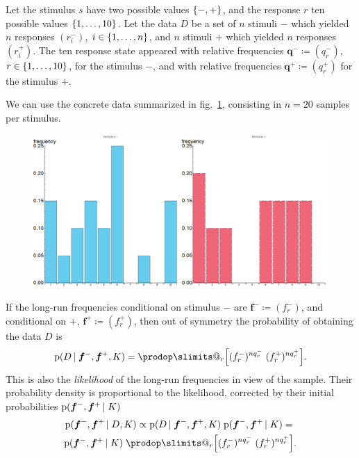 \documentclass[\ifafour a4paper,12pt,\else a5paper,10pt,\fi%
onecolumn,oneside,article,%
british%
]{memoir}
\makeatletter
\theoremstyle{remark}
\theoremstyle{innote}
\def\prod{\DOTSI\prodop\slimits@}
\newcommand*{\defd}{\coloneqq}
\DeclarePairedDelimiter\set{\{}{\}}
\newcommand*{\pf}{\mathrm{p}}%
\renewcommand*{\|}{\nonscript\,\vert\nonscript\;\mathopen{}}
\newcommand*{\fig}{fig.}%
\newcommand*{\ym}{\mathord{-}}
\newcommand*{\yp}{\mathord{+}}
\newcommand*{\yrm}{r^{-}}
\newcommand*{\yrp}{r^{+}}
\newcommand*{\yfm}{f^{-}}
\newcommand*{\yfp}{f^{+}}
\newcommand*{\yfvm}{\bm{f}^{-}}
\newcommand*{\yfvp}{\bm{f}^{+}}
\newcommand*{\yqm}{q^{-}}
\newcommand*{\yqp}{q^{+}}
\newcommand*{\yqvm}{\bm{q}^{-}}
\newcommand*{\yqvp}{\bm{q}^{+}}
\newcommand*{\yI}{K}
\makeatother
\begin{document}
Let the stimulus $s$ have two possible values $\set{\ym,\yp}$, and the
response $r$ ten possible values $\set{1,\dotsc, 10}$. Let the data $D$ be
a set of $n$ stimuli $\ym$ which yielded $n$ responses $(\yrm_i)$,
$i \in \set{1,\dotsc, n}$, and $n$ stimuli $\yp$ which yielded $n$
responses $(\yrp_i)$. The ten response state appeared with relative
frequencies $\yqvm \defd (\yqm_r)$, $r \in \set{1,\dotsc,10}$, for the
stimulus $\ym$, and with relative frequencies $\yqvp \defd (\yqp_r)$ for
the stimulus $\yp$.

We can use the concrete data summarized in
\fig~\ref{fig:sample_histograms}, consisting in $n=20$ samples per
stimulus.
\begin{figure}[h!]
\centering\includegraphics[width=\linewidth]{samples.png}\\
\caption{}\label{fig:sample_histograms}
\end{figure}%

If the long-run frequencies conditional on stimulus $\ym$ are
$\yfvm \defd (\yfm_r)$, and conditional on $\yp$, $\yfvp \defd (\yfp_r)$,
then out of symmetry the probability of obtaining the data $D$ is
\begin{equation}
  \label{eq:prob_data_from_freqs}
  \pf(D \| \yfvm, \yfvp, \yI) =
  \prod_r \Bigl[  (\yfm_r)^{n\yqm_r}\;  (\yfp_r)^{n\yqp_r}\Bigr].
\end{equation}
This is also the \emph{likelihood} of the long-run frequencies in view of
the sample. Their probability density is proportional to the likelihood,
corrected by their initial probabilities $\pf(\yfvm, \yfvp \| \yI)$
\begin{multline}
  \label{eq:prob_freqs_from_data}
  \pf(\yfvm, \yfvp \| D, \yI) \propto
  \pf(D \| \yfvm, \yfvp, \yI) \; \pf(\yfvm, \yfvp \| \yI) ={}\\
  \pf(\yfvm, \yfvp \| \yI)\;
  \prod_r \Bigl[  (\yfm_r)^{n\yqm_r}\;  (\yfp_r)^{n\yqp_r}\Bigr].
\end{multline}
\end{document}

